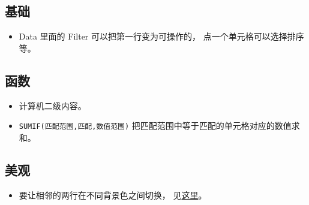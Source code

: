 
\begin{issues}
\issueDraft
\end{issues}

\subsection{基础}
\begin{itemize}
\item Data 里面的 Filter 可以把第一行变为可操作的， 点一个单元格可以选择排序等。
\end{itemize}

\subsection{函数}
\begin{itemize}
\item 计算机二级内容。
\item \verb|SUMIF(匹配范围,匹配,数值范围)| 把匹配范围中等于匹配的单元格对应的数值求和。
\end{itemize}

\subsection{美观}
\begin{itemize}
\item 要让相邻的两行在不同背景色之间切换， 见\href{https://support.office.com/en-us/article/apply-shading-to-alternate-rows-or-columns-in-a-worksheet-a443b0f5-2025-42f6-9099-5de09c05e880}{这里}。
\end{itemize}
